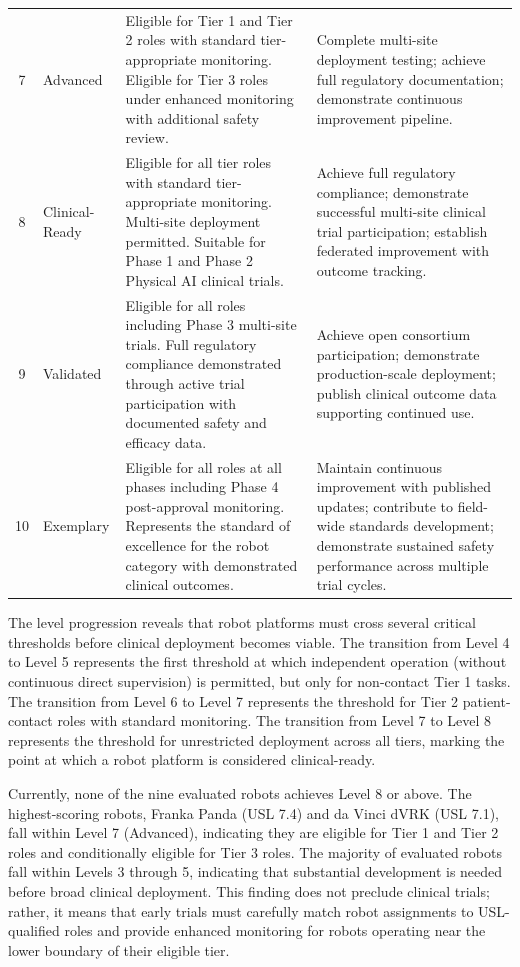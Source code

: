 \begin{longtable}{c l p{5.5cm} p{5.5cm}}
7 & Advanced & Eligible for Tier 1 and Tier 2 roles with standard tier-appropriate monitoring. Eligible for Tier 3 roles under enhanced monitoring with additional safety review. & Complete multi-site deployment testing; achieve full regulatory documentation; demonstrate continuous improvement pipeline. \\
8 & Clinical-Ready & Eligible for all tier roles with standard tier-appropriate monitoring. Multi-site deployment permitted. Suitable for Phase 1 and Phase 2 Physical AI clinical trials. & Achieve full regulatory compliance; demonstrate successful multi-site clinical trial participation; establish federated improvement with outcome tracking. \\
9 & Validated & Eligible for all roles including Phase 3 multi-site trials. Full regulatory compliance demonstrated through active trial participation with documented safety and efficacy data. & Achieve open consortium participation; demonstrate production-scale deployment; publish clinical outcome data supporting continued use. \\
10 & Exemplary & Eligible for all roles at all phases including Phase 4 post-approval monitoring. Represents the standard of excellence for the robot category with demonstrated clinical outcomes. & Maintain continuous improvement with published updates; contribute to field-wide standards development; demonstrate sustained safety performance across multiple trial cycles. \\
\end{longtable}

The level progression reveals that robot platforms must cross several critical
thresholds before clinical deployment becomes viable. The transition from Level
4 to Level 5 represents the first threshold at which independent operation
(without continuous direct supervision) is permitted, but only for non-contact
Tier 1 tasks. The transition from Level 6 to Level 7 represents the threshold
for Tier 2 patient-contact roles with standard monitoring. The transition from
Level 7 to Level 8 represents the threshold for unrestricted deployment across
all tiers, marking the point at which a robot platform is considered
clinical-ready.

Currently, none of the nine evaluated robots achieves Level 8 or above. The
highest-scoring robots, Franka Panda (USL 7.4) and da Vinci dVRK (USL 7.1),
fall within Level 7 (Advanced), indicating they are eligible for Tier 1 and
Tier 2 roles and conditionally eligible for Tier 3 roles. The majority of
evaluated robots fall within Levels 3 through 5, indicating that substantial
development is needed before broad clinical deployment. This finding does not
preclude clinical trials; rather, it means that early trials must carefully
match robot assignments to USL-qualified roles and provide enhanced monitoring
for robots operating near the lower boundary of their eligible tier.

